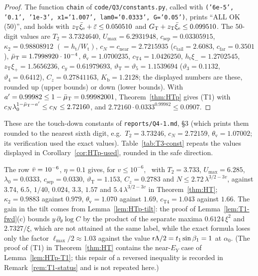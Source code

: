 \begin{proof}
The function \texttt{chain} of \texttt{code/Q3/constants.py}, called with
\texttt{('6e-5', '0.1', '1e-3', x1='1.007', lam0='0.0333', G='0.05')}, prints ``ALL OK (50)'', and
 holds with $z_{\mathrm T}\bar\xi_{\mathrm e}+\bar\varepsilon\le0.050510$ and $G_{\mathrm T}+z_{\mathrm T}\bar\xi_{\mathrm e}\le0.099510$. The $50$-digit values are
$T_2=3.7324640$, $U_{\max}=6.2931948$, $c_{\mathrm{sep}}=0.03305915$, $\kappa_2=0.98808912$ $(=h_{\mathrm t}/W_{\mathrm t})$,
$c_N=c_{\mathrm{near}}=2.7215935$ ($c_{\mathrm{tail}}=2.6083$, $c_{\mathrm{far}}=0.3501$), $\bar\mu_{\mathrm T}=1.7998920\cdot10^{-4}$,
$\theta_{\mathrm v}=1.0700235$, $c_{\mathrm T4}=1.0426250$, $h_{\mathrm t}\xi_-=1.2702545$, $z_{\mathrm T}\xi_+=1.5656236$,
$c_y=0.61979693$, $\vartheta_{\mathrm T}=\vartheta_5=1.1539694$ ($\vartheta_3=0.1132$, $\vartheta_4=0.6412$), $C_z=0.27841163$,
$K_{\mathrm b}=1.2128$; the displayed numbers are these, rounded up (upper bounds) or down (lower bounds). With $a'=0.99982\le1-\bar\mu_{\mathrm T}=
0.99982001$, Theorem~\ref{thm:HTp} gives \textup{(T1)} with $c_N\lambda_0^{1-\bar\mu_{\mathrm T}-a'}\le c_N\le2.72160$, and
$2.72160\cdot0.0333^{0.99982}\le0.0907$.
\end{proof}

These are the touch-down constants of \texttt{reports/Q4-1.md}, \S3 (which prints them rounded to the nearest sixth digit, e.g.\
$T_2=3.73246$, $c_N=2.72159$, $\theta_{\mathrm v}=1.07002$; its verification used the exact values). Table~\ref{tab:T3-const}
repeats the values displayed in Corollary~\ref{cor:HTp-used}, rounded in the safe direction.

\begin{remark}[Comparison with Theorem~\ref{thm:HT}]\label{rem:HTp-compare}
The row $\bar v=10^{-6}$, $\eta=0.1$ gives, for $v\le10^{-6}$, \MHT\ with $T_2=3.733$, $U_{\max}=6.285$, $\lambda_0=0.0333$,
$c_{\mathrm{sep}}=0.0330$, $\vartheta_{\mathrm T}=1.153$, $C_z=0.2783$ and $N\le2.72\,\lambda^{3/2-3v}$, against $3.74$, $6.5$, $1/40$, $0.024$,
$3.3$, $1.57$ and $5.4\,\lambda^{3/2-3v}$ in Theorem~\ref{thm:HT}; $\kappa_2=0.9883$ against $0.979$, $\theta_{\mathrm v}=1.070$ against $1.69$,
$c_{\mathrm T4}=1.043$ against $1.66$. The gain in the tilt comes from Lemma~\ref{lem:HTp-tilt}: the proof of Lemma~\ref{lem:T1-fwd}(c)
bounds $y\,\partial_\theta\log C$ by the product of the separate maxima $0.6124\,\xi^2$ and $2.7327/\xi$, which are not attained at the
same label, while the exact formula loses only the factor $\ell_{\max}/2\approx1.03$ against the value $\mathsf r\Lambda/2=t_1\sin\beta_1=1$ at
$\alpha_0$. (The proof of \textup{(T1)} in Theorem~\ref{thm:HT} contains the near-$E_Y$ case of Lemma~\ref{lem:HTp-T1}; this repair of
a reversed inequality is recorded in Remark~\ref{rem:T1-status} and is not repeated here.)
\end{remark}


